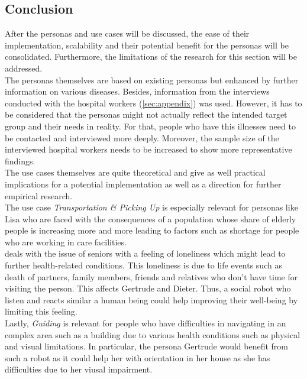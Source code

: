 \documentclass[plainarticle,zihtitle,english,final,hyperref,utf8]{zihpub}
\begin{document}
\subsection{Conclusion}
\label{sec:conclusion}
After the personas and use cases will be discussed, the ease of their implementation, scalability and their potential benefit for the personas will be consolidated. Furthermore, the limitations of the research for this section will be addressed.\\
\newline
The personas themselves are based on existing personas but enhanced by further information on various diseases. Besides, information from the interviews conducted with the hospital workers (\ref{sec:appendix}) was used. However, it has to be considered that the personas might not actually reflect the intended target group and their needs in reality. For that, people who have this illnesses need to be contacted and interviewed more deeply. Moreover, the sample size of the interviewed hospital workers needs to be increased to show more representative findings.\\
\newline
The use cases themselves are quite theoretical and give as well practical implications for a potential implementation as well as a direction for further empirical research.\\
\newline
The use case \textit{Transportation \& Picking Up} is especially relevant for personas like Lisa who are faced with the consequences of a population whose share of elderly people is increasing more and more leading to factors such as shortage for people who are working in care facilities. \\
 deals with the issue of seniors with a feeling of loneliness which might lead to further health-related conditions. This loneliness is due to life events such as death of partners, family members, friends and relatives who don't have time for visiting the person. This affects Gertrude and Dieter. Thus, a social robot who listen and reacts similar a human being could help improving their well-being by limiting this feeling.\\
Lastly, \textit{Guiding} is relevant for people who have difficulties in navigating in an complex area such as a building due to various health conditions such as physical and visual limitations. In particular, the persona Gertrude would benefit from such a robot as it could help her with orientation in her house as she has difficulties due to her viusal impairment.\\
\end{document}
